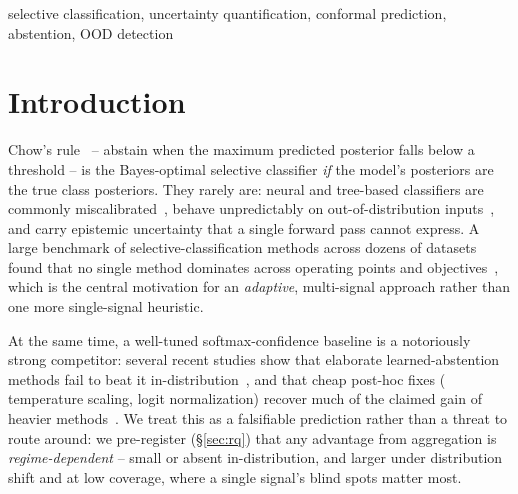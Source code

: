 \documentclass[conference]{IEEEtran}
\begin{document}
\begin{IEEEkeywords}
selective classification, uncertainty quantification, conformal prediction, abstention, OOD detection
\end{IEEEkeywords}

\section{Introduction}
\label{sec:intro}

Chow's rule~\cite{chow1970} -- abstain when the maximum predicted
posterior falls below a threshold -- is the Bayes-optimal selective
classifier \emph{if} the model's posteriors are the true class posteriors.
They rarely are: neural and tree-based classifiers are commonly
miscalibrated~\cite{guo2017calibration}, behave unpredictably on
out-of-distribution inputs~\cite{liu2020energy}, and carry epistemic
uncertainty that a single forward pass cannot express. A large benchmark
of selective-classification methods across dozens of datasets found that
no single method dominates across operating points and
objectives~\cite{pugnana2024benchmark}, which is the central motivation for an
\emph{adaptive}, multi-signal approach rather than one more single-signal
heuristic.

At the same time, a well-tuned softmax-confidence baseline is a
notoriously strong competitor: several recent studies show that elaborate
learned-abstention methods fail to beat it
in-distribution~\cite{feng2023better}, and that cheap post-hoc fixes (
temperature scaling, logit normalization) recover much of the claimed gain
of heavier methods~\cite{cattelan2023logitnorm}. We treat this as a
falsifiable prediction rather than a threat to route around: we
pre-register (\S\ref{sec:rq}) that any advantage from aggregation is
\emph{regime-dependent} -- small or absent in-distribution, and larger
under distribution shift and at low coverage, where a single signal's
blind spots matter most.
\end{document}

